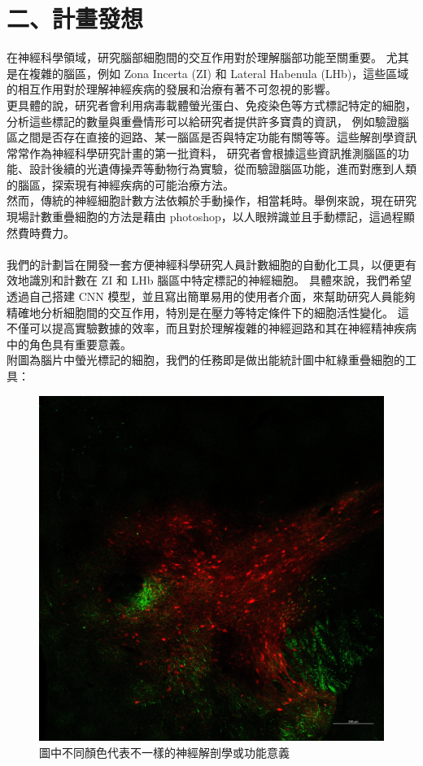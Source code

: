 \documentclass[12pt,a4paper]{article}
\begin{document}
\section*{二、計畫發想}
在神經科學領域，研究腦部細胞間的交互作用對於理解腦部功能至關重要。
尤其是在複雜的腦區，例如 Zona Incerta (ZI) 和 Lateral Habenula (LHb)，這些區域的相互作用對於理解神經疾病的發展和治療有著不可忽視的影響。\\
更具體的說，研究者會利用病毒載體螢光蛋白、免疫染色等方式標記特定的細胞，分析這些標記的數量與重疊情形可以給研究者提供許多寶貴的資訊，
例如驗證腦區之間是否存在直接的迴路、某一腦區是否與特定功能有關等等。這些解剖學資訊常常作為神經科學研究計畫的第一批資料，
研究者會根據這些資訊推測腦區的功能、設計後續的光遺傳操弄等動物行為實驗，從而驗證腦區功能，進而對應到人類的腦區，探索現有神經疾病的可能治療方法。\\
然而，傳統的神經細胞計數方法依賴於手動操作，相當耗時。舉例來說，現在研究現場計數重疊細胞的方法是藉由 photoshop，以人眼辨識並且手動標記，這過程顯然費時費力。\\
\\
我們的計劃旨在開發一套方便神經科學研究人員計數細胞的自動化工具，以便更有效地識別和計數在 ZI 和 LHb 腦區中特定標記的神經細胞。
具體來說，我們希望透過自己搭建 CNN 模型，並且寫出簡單易用的使用者介面，來幫助研究人員能夠精確地分析細胞間的交互作用，特別是在壓力等特定條件下的細胞活性變化。
這不僅可以提高實驗數據的效率，而且對於理解複雜的神經迴路和其在神經精神疾病中的角色具有重要意義。\\
附圖為腦片中螢光標記的細胞，我們的任務即是做出能統計圖中紅綠重疊細胞的工具：
\begin{figure}[h]
    \centering
    \includegraphics[width=\linewidth]{filename.jpg}
    \caption{圖中不同顏色代表不一樣的神經解剖學或功能意義}
    \label{figure}
    \end{figure}
    
\end{document}
